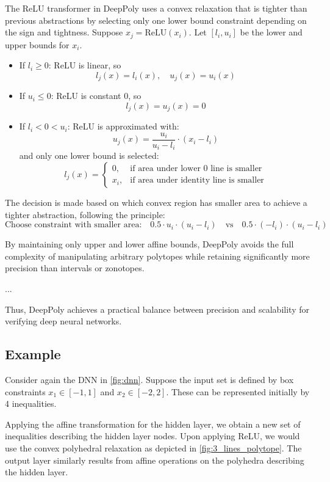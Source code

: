 \documentclass[oneside,11pt,dvipsnames]{book}
\numberwithin{equation}{section}
\theoremstyle{definition}
\theoremstyle{remark}
\begin{document}
The ReLU transformer in DeepPoly uses a convex relaxation that is tighter than previous abstractions by selecting only one lower bound constraint depending on the sign and tightness. Suppose \(x_j = \text{ReLU}(x_i)\). Let \([l_i, u_i]\) be the lower and upper bounds for \(x_i\).

\begin{itemize}
    \item If \(l_i \geq 0\): ReLU is linear, so
    \[
    l_j(x) = l_i(x), \quad u_j(x) = u_i(x)
    \]

    \item If \(u_i \leq 0\): ReLU is constant 0, so
    \[
    l_j(x) = u_j(x) = 0
    \]

    \item If \(l_i < 0 < u_i\): ReLU is approximated with:
    \[
    u_j(x) = \frac{u_i}{u_i - l_i} \cdot (x_i - l_i)
    \]
    and only one lower bound is selected:
    \[
    l_j(x) =
    \begin{cases}
        0, & \text{if area under lower 0 line is smaller} \\
        x_i, & \text{if area under identity line is smaller}
    \end{cases}
    \]
\end{itemize}

The decision is made based on which convex region has smaller area to achieve a tighter abstraction, following the principle:
\[
\text{Choose constraint with smaller area:} \quad 0.5 \cdot u_i \cdot (u_i - l_i) \quad \text{vs} \quad 0.5 \cdot (-l_i) \cdot (u_i - l_i)
\]


By maintaining only upper and lower affine bounds, DeepPoly avoids the full complexity of manipulating arbitrary polytopes while retaining significantly more precision than intervals or zonotopes. 

...

Thus, DeepPoly achieves a practical balance between precision and scalability for verifying deep neural networks.

\subsection{Example}

Consider again the DNN in \autoref{fig:dnn}. Suppose the input set is defined by box constraints \(x_1 \in [-1,1]\) and \(x_2 \in [-2,2]\). These can be represented initially by 4 inequalities.

Applying the affine transformation for the hidden layer, we obtain a new set of inequalities describing the hidden layer nodes. Upon applying ReLU, we would use the convex polyhedral relaxation as depicted in \autoref{fig:3_lines_polytope}. The output layer similarly results from affine operations on the polyhedra describing the hidden layer.
\end{document}
